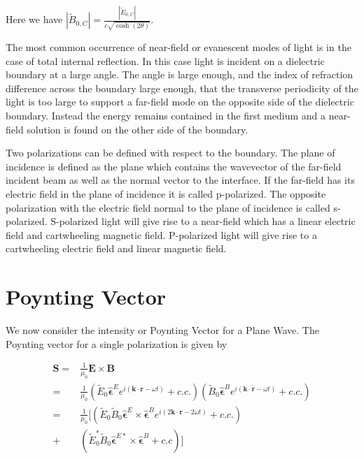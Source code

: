 \documentclass[12pt]{article}
\newcommand{\ep}{\epsilon}
\renewcommand{\vec}[1]{\boldsymbol{#1}}
\newcommand{\unitvec}[1]{\hat{\boldsymbol{#1}}}
\begin{document}
Here we have $|\tilde{B}_{0,C}| = \frac{|\tilde{E}_{0,C}|}{c\sqrt{\cosh(2\theta)}}$.





The most common occurrence of near-field or evanescent modes of light is in the case of total internal reflection.
In this case light is incident on a dielectric boundary at a large angle.
The angle is large enough, and the index of refraction difference across the boundary large enough, that the transverse periodicity of the light is too large to support a far-field mode on the opposite side of the dielectric boundary.
Instead the energy remains contained in the first medium and a near-field solution is found on the other side of the boundary.

Two polarizations can be defined with respect to the boundary.
The plane of incidence is defined as the plane which contains the wavevector of the far-field incident beam as well as the normal vector to the interface.
If the far-field has its electric field in the plane of incidence it is called p-polarized.
The opposite polarization with the electric field normal to the plane of incidence is called s-polarized.
S-polarized light will give rise to a near-field which has a linear electric field and cartwheeling magnetic field.
P-polarized light will give rise to a cartwheeling electric field and linear magnetic field.


\section{Poynting Vector}

We now consider the intensity or Poynting Vector for a Plane Wave.
The Poynting vector for a single polarization is given by

\begin{align}
\vec{S} =& \frac{1}{\mu_0} \vec{E} \times \vec{B}\\
=& \frac{1}{\mu_0}\left(\tilde{E}_0 \unitvec{\ep}^E e^{i(\vec{k}\cdot\vec{r}-\omega t)} + c.c.\right)\left(\tilde{B}_0 \unitvec{\ep}^B e^{i(\vec{k}\cdot\vec{r} - \omega t)} + c.c.\right)\\
=& \frac{1}{\mu_0}\Big[\left(\tilde{E}_0\tilde{B}_0 \unitvec{\ep}^E\times \unitvec{\ep}^B e^{i(2\vec{k}\cdot\vec{r}-2\omega t)} + c.c. \right)\\
+&\left(\tilde{E}_0^*\tilde{B}_0 \unitvec{\ep}^{E*}\times \unitvec{\ep}^B + c.c\right)  \Big]
\end{align}
\end{document}
